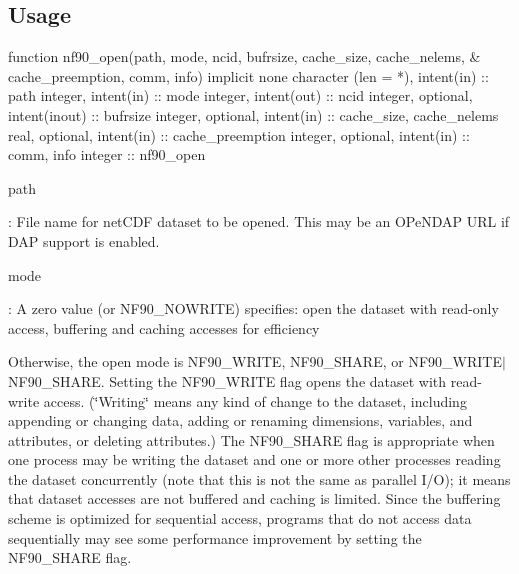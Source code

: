 \subsection*{Usage}


\begin{DoxyCode}
\textcolor{keyword}{function }nf90\_open(path, mode, ncid, bufrsize, cache\_size, cache\_nelems, &
                   cache\_preemption, comm, info)
  \textcolor{keywordtype}{implicit none}
  \textcolor{keywordtype}{character (len = *)}, \textcolor{keywordtype}{intent(in)} :: path
  \textcolor{keywordtype}{integer}, \textcolor{keywordtype}{intent(in)} :: mode
  \textcolor{keywordtype}{integer}, \textcolor{keywordtype}{intent(out)} :: ncid
  \textcolor{keywordtype}{integer}, \textcolor{keywordtype}{optional}, \textcolor{keywordtype}{intent(inout)} :: bufrsize
  \textcolor{keywordtype}{integer}, \textcolor{keywordtype}{optional}, \textcolor{keywordtype}{intent(in)} :: cache\_size, cache\_nelems
  \textcolor{keywordtype}{real}, \textcolor{keywordtype}{optional}, \textcolor{keywordtype}{intent(in)} :: cache\_preemption
  \textcolor{keywordtype}{integer}, \textcolor{keywordtype}{optional}, \textcolor{keywordtype}{intent(in)} :: comm, info
  \textcolor{keywordtype}{integer} :: nf90\_open
\end{DoxyCode}


{\ttfamily path}

\+: File name for net\+C\+DF dataset to be opened. This may be an O\+Pe\+N\+D\+AP U\+RL if D\+AP support is enabled.

{\ttfamily mode}

\+: A zero value (or N\+F90\+\_\+\+N\+O\+W\+R\+I\+TE) specifies\+: open the dataset with read-\/only access, buffering and caching accesses for efficiency

Otherwise, the open mode is N\+F90\+\_\+\+W\+R\+I\+TE, N\+F90\+\_\+\+S\+H\+A\+RE, or N\+F90\+\_\+\+W\+R\+I\+T\+E$\vert$\+N\+F90\+\_\+\+S\+H\+A\+RE. Setting the N\+F90\+\_\+\+W\+R\+I\+TE flag opens the dataset with read-\/write access. (\char`\"{}\+Writing\char`\"{} means any kind of change to the dataset, including appending or changing data, adding or renaming dimensions, variables, and attributes, or deleting attributes.) The N\+F90\+\_\+\+S\+H\+A\+RE flag is appropriate when one process may be writing the dataset and one or more other processes reading the dataset concurrently (note that this is not the same as parallel I/O); it means that dataset accesses are not buffered and caching is limited. Since the buffering scheme is optimized for sequential access, programs that do not access data sequentially may see some performance improvement by setting the N\+F90\+\_\+\+S\+H\+A\+RE flag.

